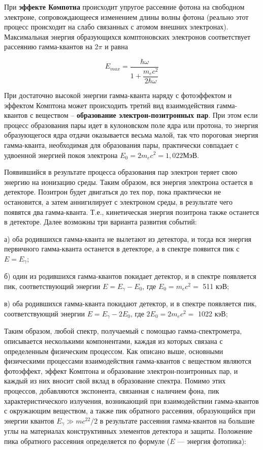 \documentclass[a4paper,12pt]{article} %
\begin{document}
При \textbf{эффекте Компотна} происходит упругое рассеяние фотона на свободном электроне, сопровождающееся изменением длины волны фотона (реально этот процесс происходит на слабо связанных с атомом внешних электронах). Максимальная энергия образующихся комптоновских электронов соответствует рассеянию гамма-квантов на $ 2\pi $ и равна
	
\begin{equation}\label{E_compton}
    E_{max} = \dfrac{\hbar \omega}{1 + \dfrac{m_ec^2}{2\hbar\omega}}
\end{equation}
	
При достаточно высокой энергии гамма-кванта наряду с фотоэффектом и эффектом Комптона может происходить третий вид взаимодействия гамма-квантов с веществом – \textbf{образование электрон-позитронных пар}. При этом если процесс образования пары идет в кулоновском поле ядра или протона, то энергия образующегося ядра отдачи оказывается весьма малой, так что пороговая энергия гамма-кванта, необходимая для образования пары, практически совпадает с удвоенной энергией покоя электрона $ E_0 = 2m_ec^2 =1,022  $МэВ.
	
Появившийся в результате процесса образования пар электрон теряет свою энергию на ионизацию среды. Таким образом, вся энергия электрона остается в детекторе. Позитрон будет двигаться до тех пор, пока практически не остановится, а затем аннигилирует с электроном среды, в результате чего появятся два гамма-кванта. Т.е., кинетическая энергия позитрона также останется в детекторе. Далее возможны три варианта развития событий:
	
а) оба родившихся гамма-кванта не вылетают из детектора, и тогда вся энергия первичного гамма-кванта останется в детекторе, а в спектре появится пик с $ E = E_\gamma $;
	
б) один из родившихся гамма-квантов покидает детектор, и в спектре появляется пик, соответствующий энергии $  E = E_\gamma - E_0 $, где $ E_0 = m_ec^2 = $ 511 кэВ;
	
в) оба родившихся гамма-кванта покидают детектор, и в спектре появляется пик, соответствующий энергии $  E = E_\gamma - 2E_0 $, где $ 2E_0 = 2m_ec^2 = $ 1022 кэВ;
	
Таким образом, любой спектр, получаемый с помощью гамма-спектрометра, описывается несколькими компонентами, каждая из которых связана с определенным физическим процессом. Как описано выше, основными физическими процессами взаимодействия гамма-квантов с веществом являются фотоэффект, эффект Комптона и образование электрон-позитронных пар, и каждый из них вносит свой вклад в образование спектра. Помимо этих процессов, добавляются экспонента, связанная с наличием фона, пик характеристического излучения, возникающий при взаимодействии гамма-квантов с окружающим веществом, а также пик обратного рассеяния, образующийся при энергии квантов $ E_\gamma \gg mc^22/2 $ в результате рассеяния гамма-квантов на большие углы на материалах конструктивных элементов детектора и защиты. Положение пика обратного рассеяния определяется по формуле ($ E $ --- энергия фотопика):
	
\end{document}
